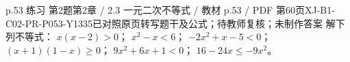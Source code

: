 \par\noindent\begin{minipage}{\linewidth}
\begin{bankitem}{p.53 练习 第2题}{第2章 / 2.3 一元二次不等式 / 教材 p.53 / PDF 第60页}{XJ-B1-C02-PR-P053-Y1335}{已对照原页转写题干及公式；待教师复核；未制作答案}
解下列不等式：
$x(x-2)>0$；
$x^2-x<6$；
$-2x^2+x-5<0$；
$(x+1)(1-x)\ge0$；
$9x^2+6x+1<0$；
$16-24x\le-9x^2$。
\end{bankitem}
\end{minipage}\par\medskip

